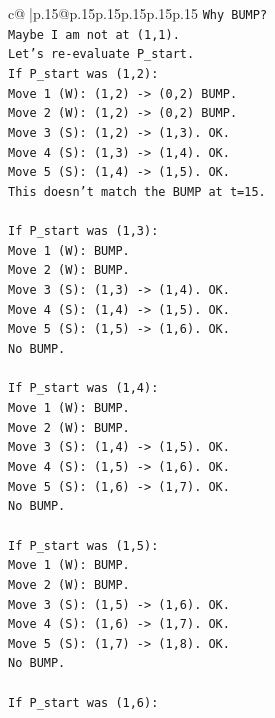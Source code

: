 \documentclass{article}
\begin{document}
{\begin{supertabular}{c@{$\;$}|p{.15\linewidth}@{}p{.15\linewidth}p{.15\linewidth}p{.15\linewidth}p{.15\linewidth}p{.15\linewidth}}
{{{\texttt{Why BUMP?} \\
\texttt{Maybe I am not at (1,1).} \\
\texttt{Let's re{-}evaluate P\_start.} \\
\texttt{If P\_start was (1,2):} \\
\texttt{Move 1 (W): (1,2) {-}> (0,2) BUMP.} \\
\texttt{Move 2 (W): (1,2) {-}> (0,2) BUMP.} \\
\texttt{Move 3 (S): (1,2) {-}> (1,3). OK.} \\
\texttt{Move 4 (S): (1,3) {-}> (1,4). OK.} \\
\texttt{Move 5 (S): (1,4) {-}> (1,5). OK.} \\
\texttt{This doesn't match the BUMP at t=15.} \\
\\ 
\texttt{If P\_start was (1,3):} \\
\texttt{Move 1 (W): BUMP.} \\
\texttt{Move 2 (W): BUMP.} \\
\texttt{Move 3 (S): (1,3) {-}> (1,4). OK.} \\
\texttt{Move 4 (S): (1,4) {-}> (1,5). OK.} \\
\texttt{Move 5 (S): (1,5) {-}> (1,6). OK.} \\
\texttt{No BUMP.} \\
\\ 
\texttt{If P\_start was (1,4):} \\
\texttt{Move 1 (W): BUMP.} \\
\texttt{Move 2 (W): BUMP.} \\
\texttt{Move 3 (S): (1,4) {-}> (1,5). OK.} \\
\texttt{Move 4 (S): (1,5) {-}> (1,6). OK.} \\
\texttt{Move 5 (S): (1,6) {-}> (1,7). OK.} \\
\texttt{No BUMP.} \\
\\ 
\texttt{If P\_start was (1,5):} \\
\texttt{Move 1 (W): BUMP.} \\
\texttt{Move 2 (W): BUMP.} \\
\texttt{Move 3 (S): (1,5) {-}> (1,6). OK.} \\
\texttt{Move 4 (S): (1,6) {-}> (1,7). OK.} \\
\texttt{Move 5 (S): (1,7) {-}> (1,8). OK.} \\
\texttt{No BUMP.} \\
\\ 
\texttt{If P\_start was (1,6):} \\
}}}
\end{supertabular}}
\end{document}
